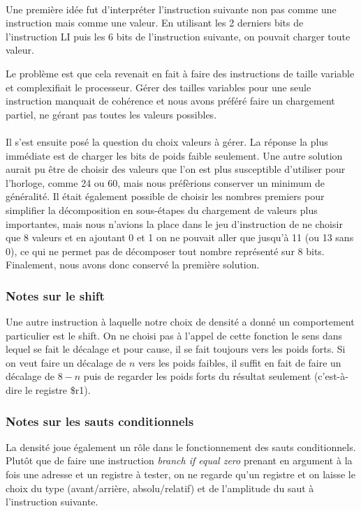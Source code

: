 \documentclass{article}
\begin{document}
\paragraph{}
Une première idée fut d'interpréter l'instruction suivante non pas comme une
instruction mais comme une valeur. En utilisant les 2 derniers bits de l'instruction
LI puis les 6 bits de l'instruction suivante, on pouvait charger toute valeur.

Le problème est que cela revenait en fait à faire des instructions de taille variable
et complexifiait le processeur. Gérer des tailles variables pour une seule instruction
manquait de cohérence et nous avons préféré faire un chargement partiel, ne gérant
pas toutes les valeurs possibles.

\paragraph{}
Il s'est ensuite posé la question du choix valeurs à gérer. La réponse la plus immédiate
est de charger les bits de poids faible seulement. Une autre solution aurait
pu être de choisir des valeurs que l'on est plus susceptible d'utiliser pour l'horloge,
comme 24 ou 60, mais nous préfèrions conserver un minimum de généralité. Il était
également possible de choisir les nombres premiers pour simplifier la décomposition
en sous-étapes du chargement de valeurs plus importantes, mais nous n'avions la place
dans le jeu d'instruction de ne choisir que 8 valeurs et en ajoutant 0 et 1 on ne
pouvait aller que jusqu'à 11 (ou 13 sans 0), ce qui ne permet pas de décomposer
tout nombre représenté sur 8 bits. Finalement, nous avons donc conservé la première
solution.

\subsubsection{Notes sur le shift}
Une autre instruction à laquelle notre choix de densité a donné un comportement
particulier est le shift. On ne choisi pas à l'appel de cette fonction le sens dans
lequel se fait le décalage et pour cause, il se fait toujours vers les poids forts.
Si on veut faire un décalage de $n$ vers les poids faibles, il suffit en fait de
faire un décalage de $8 - n$ puis de regarder les poids forts du résultat seulement
(c'est-à-dire le registre \$r1).

\subsubsection{Notes sur les sauts conditionnels}
La densité joue également un rôle dans le fonctionnement des sauts conditionnels.
Plutôt que de faire une instruction \emph{branch if equal zero} prenant en argument
à la fois une adresse et un registre à tester, on ne regarde qu'un registre et on
laisse le choix du type (avant/arrière, absolu/relatif) et de l'amplitude du saut
à l'instruction suivante.
\end{document}
